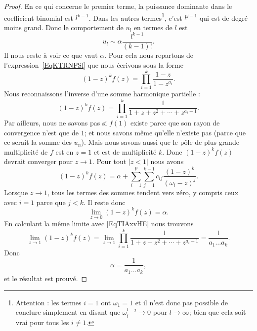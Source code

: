 \begin{proof}
    En ce qui concerne le premier terme, la puissance dominante dans le coefficient binomial est \( l^{k-1}\). Dans les autres termes\footnote{Attention : les termes \( i=1\) ont \( \omega_1=1\) et il n'est donc pas possible de conclure simplement en disant que \( \omega_i^{l-j}\to 0\) pour \( l\to \infty\); bien que cela soit vrai pour tous les \( i\neq 1\).}, c'est \( l^{j-1}\) qui est de degré moins grand. Donc le comportement de \( u_l\) en termes de \( l\) est
    \begin{equation}
        u_l\sim \alpha\frac{ l^{k-1} }{ (k-1)! }.
    \end{equation}
    Il nous reste à voir ce que vaut \( \alpha\). Pour cela nous repartons de l'expression~\ref{EqKTRNFSl} que nous écrivons sous la forme
    \begin{equation}
        (1-z)^kf(z)=\prod_{i=1}^{k}\frac{ 1-z }{ 1-z^{a_i} }.
    \end{equation}
    Nous reconnaissons l'inverse d'une somme harmonique partielle :
    \begin{equation}    \label{EqTIAxvHE}
        (1-z)^kf(z)=\prod_{i=1}^k\frac{1}{ 1+z+z^2+\cdots +z^{a_i-1} }.
    \end{equation}
    Par ailleurs, nous ne savons pas si \( f(1)\) existe parce que son rayon de convergence n'est que de \( 1\); et nous savons même qu'elle n'existe pas (parce que ce serait la somme des \( u_n\)). Mais nous savons aussi que le pôle de plus grande multiplicité de \( f\) est en \( z=1\) et est de multiplicité \( k\). Donc \( (1-z)^kf(z)\) devrait converger pour \( z\to 1\). Pour tout \( | z<1 |\) nous avons
    \begin{equation}
        (1-z)^kf(z)=\alpha+\sum_{i=1}^p\sum_{j=1}^{k-1}c_{ij}\frac{ (1-z)^k }{ (\omega_i-z)^j }.
    \end{equation}
    Lorsque \( z\to 1\), tous les termes des sommes tendent vers zéro, y compris ceux avec \( i=1\) parce que \( j<k\). Il reste donc
    \begin{equation}
        \lim_{z\to 0} (1-z)^kf(z)=\alpha.
    \end{equation}
    En calculant la même limite avec \eqref{EqTIAxvHE} nous trouvons
    \begin{equation}
        \lim_{z\to 1}(1-z)^kf(z)=\lim_{z\to 1}\prod_{i=1}^k\frac{1}{ 1+z+z^2+\cdots +z^{a_i-1} }=\frac{1}{ a_1\ldots a_k }.
    \end{equation}
    Donc
    \begin{equation}
        \alpha=\frac{1}{ a_1\ldots a_k },
    \end{equation}
    et le résultat est prouvé.
\end{proof}

